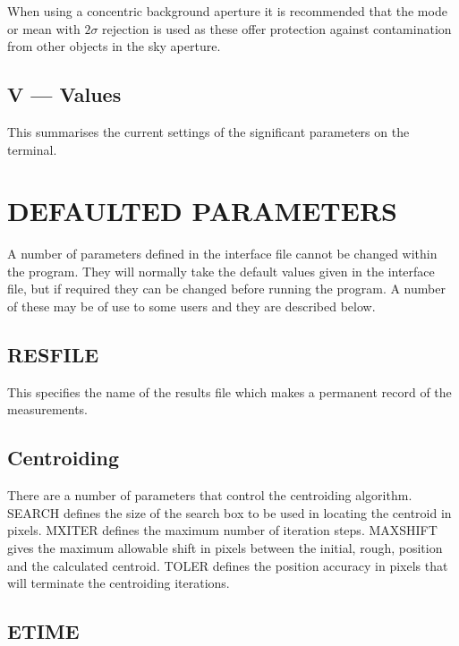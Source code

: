When using a concentric background aperture it is recommended that the
mode or mean with $2\sigma$ rejection is used as these offer protection
against contamination from other objects in the sky aperture.

\subsection{V --- Values}

This summarises the current settings of the significant parameters on
the terminal.


\section{DEFAULTED PARAMETERS}

A number of parameters defined in the interface file cannot be changed
within the program. They will normally take the default values given in
the interface file, but if required they can be changed before running
the program. A number of these may be of use to some users and they are
described below.

\subsection{RESFILE}

This specifies the name of the results file which makes a permanent record
of the measurements.

\subsection{Centroiding}

There are a number of parameters that control the centroiding algorithm.
SEARCH defines the size of the search box to be used in locating the
centroid in pixels. MXITER defines the maximum number of iteration steps.
MAXSHIFT gives the maximum allowable shift in pixels between the initial,
rough, position and the calculated centroid. TOLER defines the position
accuracy in pixels that will terminate the centroiding iterations.

\subsection{ETIME}

